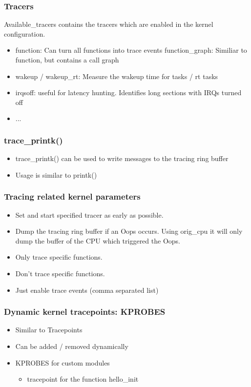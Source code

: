 % 
\begin{frame}[fragile]
    \frametitle{Tracers}

% 
Available\_tracers contains the tracers which are enabled in the kernel configuration.

    \begin{itemize}
        \item function: Can turn all functions into trace events function\_graph: Similiar to function, but contains a call graph
        \item wakeup / wakeup\_rt: Measure the wakeup time for tasks / rt tasks
        \item irqsoff: useful for latency hunting. Identifies long sections with IRQs turned off
        \item  ...
    \end{itemize}
% 
\end{frame}
\begin{frame}[fragile]
    \frametitle{trace\_printk()}


    \begin{itemize}
        \item trace\_printk() can be used to write messages to the tracing ring buffer
        \item Usage is similar to printk()
    \end{itemize}
% 
\end{frame}
\begin{frame}[fragile]
    \frametitle{Tracing related kernel parameters}


    \begin{itemize}
        \item Set and start specified tracer as early as possible.
        \item Dump the tracing ring buffer if an Oops occurs. Using orig\_cpu it will only dump the buffer of the CPU which triggered the Oops.
        \item Only trace specific functions.
        \item Don't trace specific functions.
        \item Just enable trace events (comma separated list)
    \end{itemize}
% 
\end{frame}
\begin{frame}[fragile]
    \frametitle{Dynamic kernel tracepoints: KPROBES}


    \begin{itemize}
        \item Similar to Tracepoints
        \item Can be added / removed dynamically
        \item KPROBES for custom modules
	    \begin{itemize}
	        \item tracepoint for the function hello\_init
      \end{itemize}
    \end{itemize}
% 
\end{frame}
